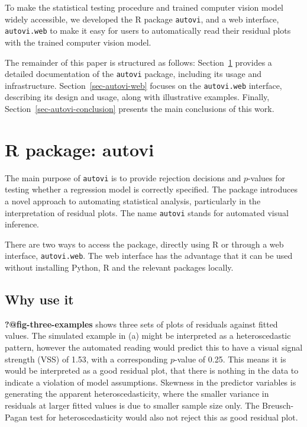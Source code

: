 \documentclass[
doublespace,
  times]{anzsauth}
\begin{document}
To make the statistical testing procedure and trained computer vision
model widely accessible, we developed the R package \texttt{autovi}, and
a web interface, \texttt{autovi.web} to make it easy for users to
automatically read their residual plots with the trained computer vision
model.

The remainder of this paper is structured as follows:
Section~\ref{sec-autovi} provides a detailed documentation of the
\texttt{autovi} package, including its usage and infrastructure.
Section~\ref{sec-autovi-web} focuses on the \texttt{autovi.web}
interface, describing its design and usage, along with illustrative
examples. Finally, Section~\ref{sec-autovi-conclusion} presents the main
conclusions of this work.

\section{R package: autovi}\label{sec-autovi}

The main purpose of \texttt{autovi} is to provide rejection decisions
and \(p\)-values for testing whether a regression model is correctly
specified. The package introduces a novel approach to automating
statistical analysis, particularly in the interpretation of residual
plots. The name \texttt{autovi} stands for automated visual inference.

There are two ways to access the package, directly using R or through a
web interface, \texttt{autovi.web}. The web interface has the advantage
that it can be used without installing Python, R and the relevant
packages locally.

\subsection{Why use it}\label{sec-why}

\textbf{?@fig-three-examples} shows three sets of plots of residuals
against fitted values. The simulated example in (a) might be interpreted
as a heteroscedastic pattern, however the automated reading would
predict this to have a visual signal strength (VSS) of 1.53, with a
corresponding \(p\)-value of 0.25. This means it is would be interpreted
as a good residual plot, that there is nothing in the data to indicate a
violation of model assumptions. Skewness in the predictor variables is
generating the apparent heteroscedasticity, where the smaller variance
in residuals at larger fitted values is due to smaller sample size only.
The Breusch-Pagan test \citep{breusch1979simple} for heteroscedasticity
would also not reject this as good residual plot.
\end{document}
